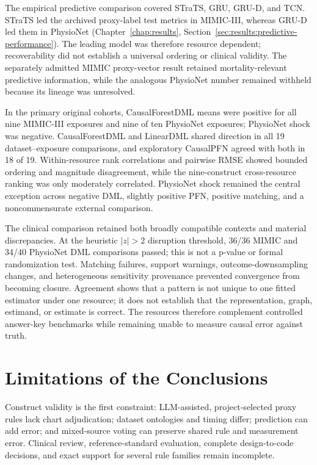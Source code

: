 The empirical predictive comparison covered STraTS, GRU, GRU-D, and TCN.  STraTS led the archived proxy-label test metrics in MIMIC-III, whereas GRU-D led them in PhysioNet (Chapter~\ref{chap:results}, Section~\ref{sec:results:predictive-performance}).  The leading model was therefore resource dependent; recoverability did not establish a universal ordering or clinical validity.  The separately admitted MIMIC proxy-vector result retained mortality-relevant predictive information, while the analogous PhysioNet number remained withheld because its lineage was unresolved.

In the primary original cohorts, CausalForestDML means were positive for all nine MIMIC-III exposures and nine of ten PhysioNet exposures; PhysioNet shock was negative.  CausalForestDML and LinearDML shared direction in all 19 dataset--exposure comparisons, and exploratory CausalPFN agreed with both in 18 of 19.  Within-resource rank correlations and pairwise RMSE showed bounded ordering and magnitude disagreement, while the nine-construct cross-resource ranking was only moderately correlated.  PhysioNet shock remained the central exception across negative DML, slightly positive PFN, positive matching, and a noncommensurate external comparison.

The clinical comparison retained both broadly compatible contexts and material discrepancies.  At the heuristic $\lvert z\rvert>2$ disruption threshold, 36/36 MIMIC and 34/40 PhysioNet DML comparisons passed; this is not a p-value or formal randomization test.  Matching failures, support warnings, outcome-downsampling changes, and heterogeneous sensitivity provenance prevented convergence from becoming closure.  Agreement shows that a pattern is not unique to one fitted estimator under one resource; it does not establish that the representation, graph, estimand, or estimate is correct.  The resources therefore complement controlled answer-key benchmarks while remaining unable to measure causal error against truth.

\section{Limitations of the Conclusions}
\label{sec:conclusions-future-work:limitations-of-the-conclusions}

Construct validity is the first constraint: LLM-assisted, project-selected proxy rules lack chart adjudication; dataset ontologies and timing differ; prediction can add error; and mixed-source voting can preserve shared rule and measurement error.  Clinical review, reference-standard evaluation, complete design-to-code decisions, and exact support for several rule families remain incomplete.

